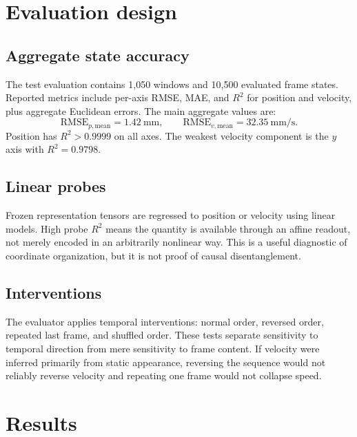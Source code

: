 \documentclass[11pt,a4paper]{article}
\begin{document}
\section{Evaluation design}
\subsection{Aggregate state accuracy}
The test evaluation contains 1,050 windows and 10,500 evaluated frame states. Reported metrics include per-axis RMSE, MAE, and $R^2$ for position and velocity, plus aggregate Euclidean errors. The main aggregate values are:
\begin{equation}
\mathrm{RMSE}_{p,\mathrm{mean}}=1.42\ \mathrm{mm},\qquad
\mathrm{RMSE}_{v,\mathrm{mean}}=32.35\ \mathrm{mm/s}.
\end{equation}
Position has $R^2>0.9999$ on all axes. The weakest velocity component is the $y$ axis with $R^2=0.9798$.

\subsection{Linear probes}
Frozen representation tensors are regressed to position or velocity using linear models. High probe $R^2$ means the quantity is available through an affine readout, not merely encoded in an arbitrarily nonlinear way. This is a useful diagnostic of coordinate organization, but it is not proof of causal disentanglement.

\subsection{Interventions}
The evaluator applies temporal interventions: normal order, reversed order, repeated last frame, and shuffled order. These tests separate sensitivity to temporal direction from mere sensitivity to frame content. If velocity were inferred primarily from static appearance, reversing the sequence would not reliably reverse velocity and repeating one frame would not collapse speed.

\section{Results}
\end{document}
